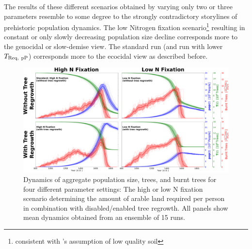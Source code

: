 The results of these different scenarios obtained by varying only two or three parameters resemble to some degree to the strongly contradictory storylines of prehistoric population dynamics.
The low Nitrogen fixation scenario\footnote{consistent with \citet{Hunt2007}'s assumption of low quality soil} resulting in constant or only slowly decreasing population size decline corresponds more to the genocidal \citep{Hunt2007} or slow-demise \citep{Brandt2015} view.
The standard run (and run with lower $T_{\rm Req, \ pP}$) corresponds more to the ecocidal view as described before.



\begin{figure}
	\centering
	\includegraphics[width=1.3\textwidth, center]{images/Results/Standard/EnsembleStatistics_allTheories}
	\caption{Dynamics of aggregate population size, trees, and burnt trees for four different parameter settings: The high or low N fixation scenario determining the amount of arable land required per person in combination with disabled/enabled tree regrowth.
		All panels show mean dynamics obtained from an ensemble of 15 runs.}
	\label{fig:ensemblestatisticsalltheories}
\end{figure}

